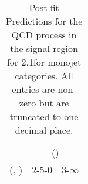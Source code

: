 \begin{table}[h!]
\tiny
\centering
\caption{Post fit Predictions for the QCD process in the signal region for 2.1\ifb for monojet categories. All entries are non-zero but are truncated to one decimal place.\label{tab:predseppost_sig_qcd_mono}}
\begin{tabular}
{ccc}
	\hline\hline
	& \multicolumn{2}{c}{\scalht (\gev)} \\ 
	 (\njet,  \nb) & 2-5-0 & 3-$\infty$ \\ [0.8ex] 
\hline
	\hline
	\hline
\end{tabular}
\end{table}
